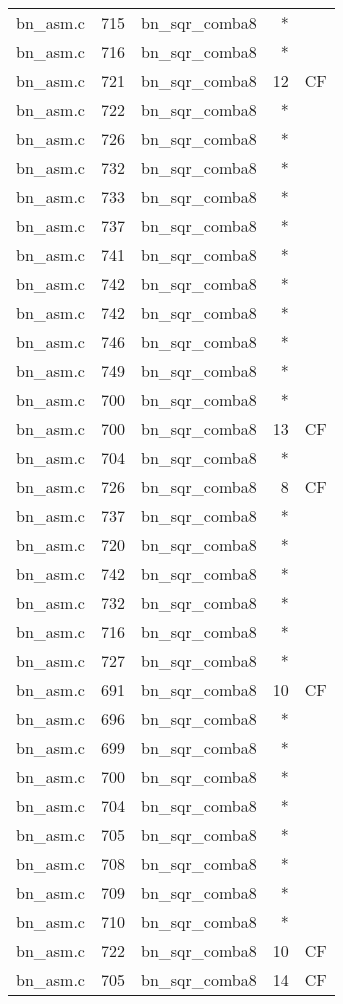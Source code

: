\begin{table}[h!]
\begin{tabular}{lrlrr}
bn\_asm.c& 715&bn\_sqr\_comba8&*&\\
bn\_asm.c& 716&bn\_sqr\_comba8&*&\\
bn\_asm.c& 721&bn\_sqr\_comba8&12&CF\\
bn\_asm.c& 722&bn\_sqr\_comba8&*&\\
bn\_asm.c& 726&bn\_sqr\_comba8&*&\\
bn\_asm.c& 732&bn\_sqr\_comba8&*&\\
bn\_asm.c& 733&bn\_sqr\_comba8&*&\\
bn\_asm.c& 737&bn\_sqr\_comba8&*&\\
bn\_asm.c& 741&bn\_sqr\_comba8&*&\\
bn\_asm.c& 742&bn\_sqr\_comba8&*&\\
bn\_asm.c& 742&bn\_sqr\_comba8&*&\\
bn\_asm.c& 746&bn\_sqr\_comba8&*&\\
bn\_asm.c& 749&bn\_sqr\_comba8&*&\\
bn\_asm.c& 700&bn\_sqr\_comba8&*&\\
bn\_asm.c& 700&bn\_sqr\_comba8&13&CF\\
bn\_asm.c& 704&bn\_sqr\_comba8&*&\\
bn\_asm.c& 726&bn\_sqr\_comba8&8 &CF\\
bn\_asm.c& 737&bn\_sqr\_comba8&*&\\
bn\_asm.c& 720&bn\_sqr\_comba8&*&\\
bn\_asm.c& 742&bn\_sqr\_comba8&*&\\
bn\_asm.c& 732&bn\_sqr\_comba8&*&\\
bn\_asm.c& 716&bn\_sqr\_comba8&*&\\
bn\_asm.c& 727&bn\_sqr\_comba8&*&\\
bn\_asm.c& 691&bn\_sqr\_comba8&10&CF\\
bn\_asm.c& 696&bn\_sqr\_comba8&*&\\
bn\_asm.c& 699&bn\_sqr\_comba8&*&\\
bn\_asm.c& 700&bn\_sqr\_comba8&*&\\
bn\_asm.c& 704&bn\_sqr\_comba8&*&\\
bn\_asm.c& 705&bn\_sqr\_comba8&*&\\
bn\_asm.c& 708&bn\_sqr\_comba8&*&\\
bn\_asm.c& 709&bn\_sqr\_comba8&*&\\
bn\_asm.c& 710&bn\_sqr\_comba8&*&\\
bn\_asm.c& 722&bn\_sqr\_comba8&10&CF\\
bn\_asm.c& 705&bn\_sqr\_comba8&14&CF\\

\end{tabular}
\end{table}
